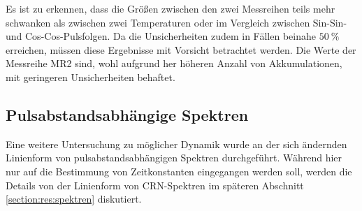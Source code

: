 Es ist zu erkennen, dass die Größen zwischen den zwei Messreihen teils mehr schwanken als zwischen zwei Temperaturen oder im Vergleich zwischen Sin-Sin- und Cos-Cos-Pulsfolgen. Da die Unsicherheiten zudem in Fällen beinahe $\SI{50}{\percent}$ erreichen, müssen diese Ergebnisse mit Vorsicht betrachtet werden. Die Werte der Messreihe MR2 sind, wohl aufgrund her höheren Anzahl von Akkumulationen, mit geringeren Unsicherheiten behaftet.



\subsection{Pulsabstandsabhängige Spektren} \label{section:res:spekdyn}

Eine weitere Untersuchung zu möglicher Dynamik wurde an der sich ändernden Linienform von pulsabstandsabhängigen Spektren durchgeführt. Während hier nur auf die Bestimmung von Zeitkonstanten eingegangen werden soll, werden die Details von der Linienform von CRN-Spektren im späteren Abschnitt \ref{section:res:spektren} diskutiert.

